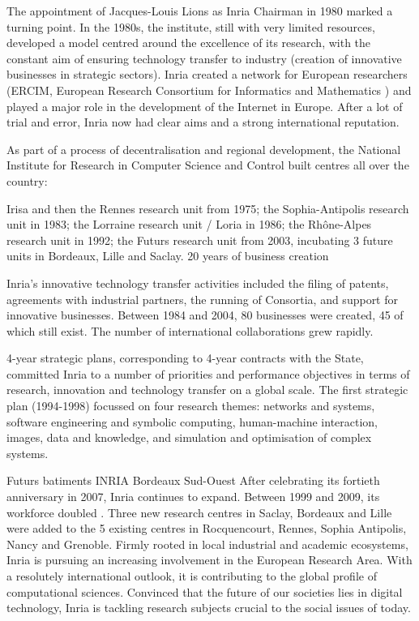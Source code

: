 The appointment of Jacques-Louis Lions as Inria Chairman in 1980 marked a turning point. In the 1980s, the institute, still with very limited resources, developed a model centred around the excellence of its research, with the constant aim of ensuring technology transfer to industry (creation of innovative businesses in strategic sectors). Inria created a network for European researchers (ERCIM, European Research Consortium for Informatics and Mathematics ) and played a major role in the development of the Internet in Europe. After a lot of trial and error, Inria now had clear aims and a strong international reputation.


As part of a process of decentralisation and regional development, the National Institute for Research in Computer Science and Control built centres all over the country:

Irisa and then the Rennes research unit from 1975;
the Sophia-Antipolis research unit in 1983;
the Lorraine research unit / Loria in 1986;
the Rhône-Alpes research unit in 1992;
the Futurs research unit from 2003, incubating 3 future units in Bordeaux, Lille and Saclay.
20 years of business creation

Inria's innovative technology transfer activities included the filing of patents, agreements with industrial partners, the running of Consortia, and support for innovative businesses. Between 1984 and 2004, 80 businesses were created, 45 of which still exist. The number of international collaborations grew rapidly.


4-year strategic plans, corresponding to 4-year contracts with the State, committed Inria to a number of priorities and performance objectives in terms of research, innovation and technology transfer on a global scale.
The first strategic plan (1994-1998) focussed on four research themes: networks and systems, software engineering and symbolic computing, human-machine interaction, images, data and knowledge, and simulation and optimisation of complex systems.


Futurs batiments INRIA Bordeaux Sud-Ouest
After celebrating its fortieth anniversary in 2007, Inria continues to expand. Between 1999 and 2009, its workforce doubled . Three new research centres in Saclay, Bordeaux and Lille were added to the 5 existing centres in Rocquencourt,  Rennes,  Sophia Antipolis, Nancy and  Grenoble. Firmly rooted in local industrial and academic ecosystems, Inria is pursuing an increasing involvement in the European Research Area. With a resolutely international outlook, it is contributing to the global profile of computational sciences. Convinced that the future of our societies lies in digital technology, Inria is tackling research subjects crucial to the social issues of today.

